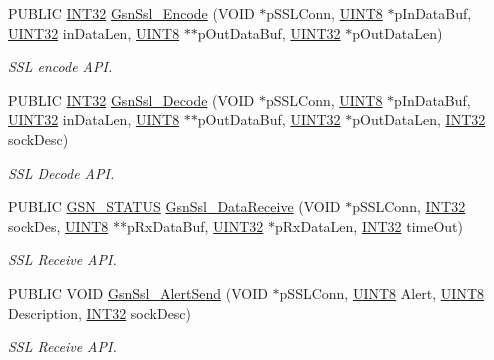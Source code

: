 \begin{DoxyCompactItemize}
PUBLIC \hyperlink{a00660_ga63021d67d54286c2163bcdb43a6f2569}{INT32} \hyperlink{a00674_ga0a0b2a99da357ea291fe513d0d7f9e62}{GsnSsl\_\-Encode} (VOID $\ast$pSSLConn, \hyperlink{a00660_gab27e9918b538ce9d8ca692479b375b6a}{UINT8} $\ast$pInDataBuf, \hyperlink{a00660_gae1e6edbbc26d6fbc71a90190d0266018}{UINT32} inDataLen, \hyperlink{a00660_gab27e9918b538ce9d8ca692479b375b6a}{UINT8} $\ast$$\ast$pOutDataBuf, \hyperlink{a00660_gae1e6edbbc26d6fbc71a90190d0266018}{UINT32} $\ast$pOutDataLen)
\begin{DoxyCompactList}\small\item\em SSL encode API. \end{DoxyCompactList}\item 
PUBLIC \hyperlink{a00660_ga63021d67d54286c2163bcdb43a6f2569}{INT32} \hyperlink{a00674_ga39281464090e59585ad982be685dbf14}{GsnSsl\_\-Decode} (VOID $\ast$pSSLConn, \hyperlink{a00660_gab27e9918b538ce9d8ca692479b375b6a}{UINT8} $\ast$pInDataBuf, \hyperlink{a00660_gae1e6edbbc26d6fbc71a90190d0266018}{UINT32} inDataLen, \hyperlink{a00660_gab27e9918b538ce9d8ca692479b375b6a}{UINT8} $\ast$$\ast$pOutDataBuf, \hyperlink{a00660_gae1e6edbbc26d6fbc71a90190d0266018}{UINT32} $\ast$pOutDataLen, \hyperlink{a00660_ga63021d67d54286c2163bcdb43a6f2569}{INT32} sockDesc)
\begin{DoxyCompactList}\small\item\em SSL Decode API. \end{DoxyCompactList}\item 
PUBLIC \hyperlink{a00660_gada5951904ac6110b1fa95e51a9ddc217}{GSN\_\-STATUS} \hyperlink{a00674_ga7f017b2db979edeb90345bd1168434ee}{GsnSsl\_\-DataReceive} (VOID $\ast$pSSLConn, \hyperlink{a00660_ga63021d67d54286c2163bcdb43a6f2569}{INT32} sockDes, \hyperlink{a00660_gab27e9918b538ce9d8ca692479b375b6a}{UINT8} $\ast$$\ast$pRxDataBuf, \hyperlink{a00660_gae1e6edbbc26d6fbc71a90190d0266018}{UINT32} $\ast$pRxDataLen, \hyperlink{a00660_ga63021d67d54286c2163bcdb43a6f2569}{INT32} timeOut)
\begin{DoxyCompactList}\small\item\em SSL Receive API. \end{DoxyCompactList}\item 
PUBLIC VOID \hyperlink{a00674_ga3ad38224bcf86318bcc28deccbc2b9c9}{GsnSsl\_\-AlertSend} (VOID $\ast$pSSLConn, \hyperlink{a00660_gab27e9918b538ce9d8ca692479b375b6a}{UINT8} Alert, \hyperlink{a00660_gab27e9918b538ce9d8ca692479b375b6a}{UINT8} Description, \hyperlink{a00660_ga63021d67d54286c2163bcdb43a6f2569}{INT32} sockDesc)
\begin{DoxyCompactList}\small\item\em SSL Receive API. \end{DoxyCompactList}\item 
$$
\end{DoxyCompactItemize}
